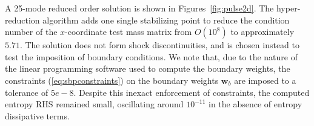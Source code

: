 \documentclass[preprint,10pt]{elsarticle}
\theoremstyle{definition}
\theoremstyle{lemma}
\theoremstyle{theorem}
\theoremstyle{assumption}
\begin{document}
A 25-mode reduced order solution is shown in Figures~\ref{fig:pulse2d}.  The hyper-reduction algorithm adds one single stabilizing point to reduce the condition number of the $x$-coordinate test mass matrix from $O(10^{8})$ to approximately $5.71$.  The solution does not form shock discontinuities, and is chosen instead to test the imposition of boundary conditions.  We note that, due to the nature of the linear programming software used to compute the boundary weights, the constraints (\ref{eq:sbpconstraints}) on the boundary weights $\bm{w}_b$ are imposed to a tolerance of $5e-8$.  Despite this inexact enforcement of constraints, the computed entropy RHS remained small, oscillating around $10^{-11}$ in the absence of entropy dissipative terms.  

\begin{figure}
\centering
\hspace{.1em}
\hspace{.1em}

\end{figure}
\end{document}
